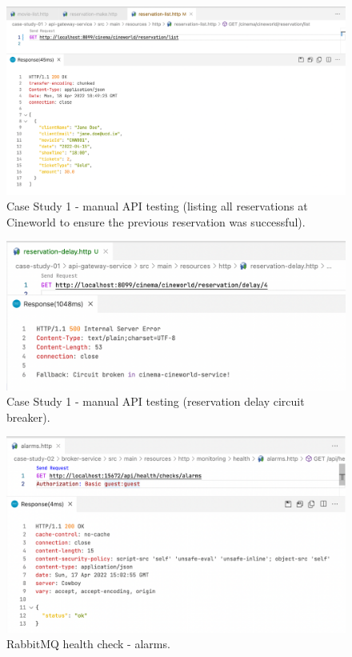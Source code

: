 \begin{figure}[H]
  \centering
  \includegraphics[width=1.0\linewidth]{./assets/images/case-studies/cs01-manual-3.png}
  \caption{Case Study 1 - manual API testing (listing all reservations at Cineworld to ensure the previous reservation was successful).}
  \label{fig:cs01-manual-3}
\end{figure}

\begin{figure}[H]
  \centering
  \includegraphics[width=1.0\linewidth]{./assets/images/case-studies/cs01-manual-4.png}
  \caption{Case Study 1 - manual API testing (reservation delay circuit breaker).}
  \label{fig:cs01-manual-4}
\end{figure}


\begin{figure}[H]
  \centering
  \includegraphics[width=1.0\linewidth]{./assets/images/case-studies/cs02-hc1.png}
  \caption{RabbitMQ health check - alarms.}
  \label{fig:cs02-hc1}
\end{figure}

